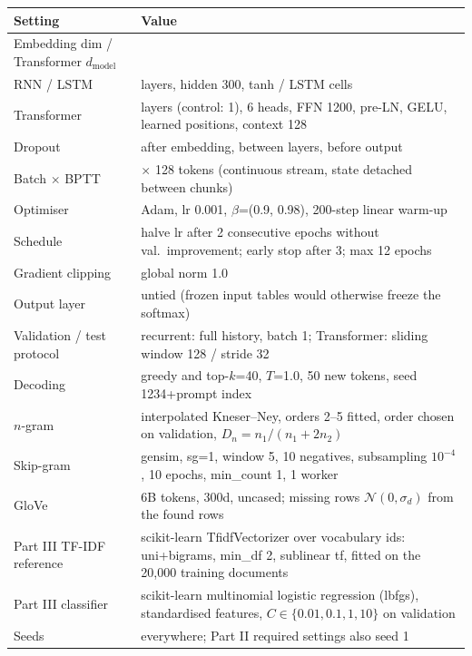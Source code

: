 \begin{tabular}{@{}l>{\raggedright\arraybackslash}p{11.3cm}@{}}
\toprule
Setting & Value \\
\midrule
Embedding dim / Transformer $d_\mathrm{model}$ & 300 \\
RNN / LSTM & 2 layers, hidden 300, tanh / LSTM cells \\
Transformer & 4 layers (control: 1), 6 heads, FFN 1200, pre-LN, GELU, learned positions, context 128 \\
Dropout & 0.3 after embedding, between layers, before output \\
Batch $\times$ BPTT & 32 $\times$ 128 tokens (continuous stream, state detached between chunks) \\
Optimiser & Adam, lr 0.001, $\beta$=(0.9, 0.98), 200-step linear warm-up \\
Schedule & halve lr after 2 consecutive epochs without val.\ improvement; early stop after 3; max 12 epochs \\
Gradient clipping & global norm 1.0 \\
Output layer & untied (frozen input tables would otherwise freeze the softmax) \\
Validation / test protocol & recurrent: full history, batch 1; Transformer: sliding window 128 / stride 32 \\
Decoding & greedy and top-$k$=40, $T$=1.0, 50 new tokens, seed 1234+prompt index \\
$n$-gram & interpolated Kneser--Ney, orders 2--5 fitted, order chosen on validation, $D_n = n_1/(n_1+2n_2)$ \\
Skip-gram & gensim, sg=1, window 5, 10 negatives, subsampling $10^{-4}$, 10 epochs, min\_count 1, 1 worker \\
GloVe & 6B tokens, 300d, uncased; missing rows $\mathcal{N}(0, \sigma_d)$ from the found rows \\
Part III TF-IDF reference & scikit-learn TfidfVectorizer over vocabulary ids: uni+bigrams, min\_df 2, sublinear tf, fitted on the 20,000 training documents \\
Part III classifier & scikit-learn multinomial logistic regression (lbfgs), standardised features, $C\in\{0.01,0.1,1,10\}$ on validation \\
Seeds & 0 everywhere; Part II required settings also seed 1 \\
\bottomrule
\end{tabular}